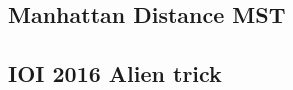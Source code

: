 \documentclass[a4paper,10pt,twocolumn,oneside]{article}
\begin{document}
\subsection{Manhattan Distance MST}

% 
% 
\subsection{IOI 2016 Alien trick}

% 
\end{document}
